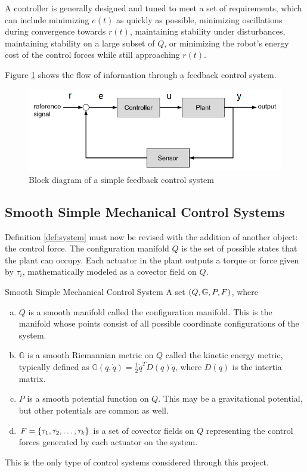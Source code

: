 \documentclass[main.tex]{subfiles}
\begin{document}
A controller is generally designed and tuned to meet a set of requirements\cite{franklin2002feedback}, which can include minimizing $e(t)$ as quickly as possible, minimizing oscillations during convergence towards $r(t)$, maintaining stability under disturbances, maintaining stability on a large subset of $Q$, or minimizing the robot's energy cost of the control forces while still approaching $r(t)$.

Figure \ref{fig:feedback} shows the flow of information through a feedback control system.
\begin{figure}[h]
    \centering
    \includegraphics[width=0.75\columnwidth]{assets/feedback-modified.png}
    \caption{Block diagram of a simple feedback control system}
    \label{fig:feedback}
\end{figure}



\subsection{Smooth Simple Mechanical Control Systems}
Definition \ref{def:system} must now be revised with the addition of another object: the control force. 
The configuration manifold $Q$ is the set of possible states that the plant can occupy.
Each actuator in the plant outputs a torque or force given by $\tau_i$, mathematically modeled as a covector field on $Q$. 
\begin{boxdef}{Smooth Simple Mechanical Control System \cite{bullo2019geometric}}
A set $\del{Q,\mathbb{G},P,F}$, where
\begin{enumerate}[(a)]
    \item $Q$ is a smooth manifold called the configuration manifold. This is the manifold whose points consist of all possible coordinate configurations of the system.
    \item $\mathbb{G}$ is a smooth Riemannian metric on $Q$ called the kinetic energy metric, typically defined as $\mathbb{G}(q,\dot q)=\frac{1}{2}\dot q^T D(q) \dot q$, where $D(q)$ is the intertia matrix.
    \item $P$ is a smooth potential function on $Q$. This may be a gravitational potential, but other potentials are common as well.
    \item $F=\cbr{\tau_1,\tau_2,\ldots,\tau_k}$ is a set of covector fields on $Q$ representing the control forces generated by each actuator on the system.
\end{enumerate}
\end{boxdef}\label{def:controlsystem}
This is the only type of control systems considered through this project.
\end{document}
